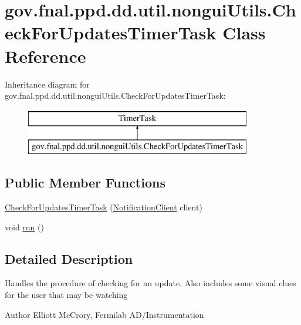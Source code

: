 \hypertarget{classgov_1_1fnal_1_1ppd_1_1dd_1_1util_1_1nonguiUtils_1_1CheckForUpdatesTimerTask}{\section{gov.\-fnal.\-ppd.\-dd.\-util.\-nongui\-Utils.\-Check\-For\-Updates\-Timer\-Task Class Reference}
\label{classgov_1_1fnal_1_1ppd_1_1dd_1_1util_1_1nonguiUtils_1_1CheckForUpdatesTimerTask}
}
Inheritance diagram for gov.\-fnal.\-ppd.\-dd.\-util.\-nongui\-Utils.\-Check\-For\-Updates\-Timer\-Task\-:\begin{figure}[H]
\begin{center}
\leavevmode
\includegraphics[height=2.000000cm]{classgov_1_1fnal_1_1ppd_1_1dd_1_1util_1_1nonguiUtils_1_1CheckForUpdatesTimerTask}
\end{center}
\end{figure}
\subsection*{Public Member Functions}
\begin{DoxyCompactItemize}
\item 
\hyperlink{classgov_1_1fnal_1_1ppd_1_1dd_1_1util_1_1nonguiUtils_1_1CheckForUpdatesTimerTask_aefaab26ab35c0077141b6c3789267fcb}{Check\-For\-Updates\-Timer\-Task} (\hyperlink{interfacegov_1_1fnal_1_1ppd_1_1dd_1_1interfaces_1_1NotificationClient}{Notification\-Client} client)
\item 
void \hyperlink{classgov_1_1fnal_1_1ppd_1_1dd_1_1util_1_1nonguiUtils_1_1CheckForUpdatesTimerTask_a96458e29ba739f0af05ba113396eb931}{run} ()
\end{DoxyCompactItemize}


\subsection{Detailed Description}
Handles the procedure of checking for an update. Also includes some visual clues for the user that may be watching

\begin{DoxyAuthor}{Author}
Elliott Mc\-Crory, Fermilab A\-D/\-Instrumentation 
\end{DoxyAuthor}


